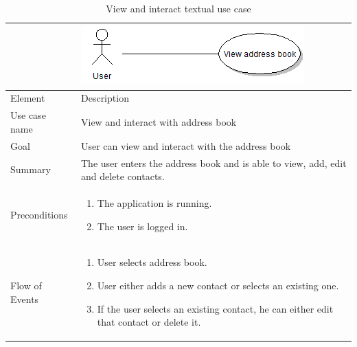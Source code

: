 \begin{table}
\begin{tabular}{p{3cm}p{12cm}}
& \includegraphics{view_address_book}\\ \hline
Element & Description \\ \hline
Use case name & View and interact with address book \\
Goal & User can view and interact with the address book \\
Summary &The user enters the address book and is able to view, add, edit and delete contacts. \\
Preconditions &
\begin{enumerate}
\item{}The application is running.
\item{}The user is logged in.
\end{enumerate} \\ \hline
Flow of Events &
\begin{enumerate}
\item{}User selects address book.
\item{}User either adds a new contact or selects an existing one.
\item{}If the user selects an existing contact, he can either edit that contact or delete it.
\end{enumerate}
\end{tabular}
\caption{View and interact textual use case} \label{tab:viewandinteract}
\end{table}

